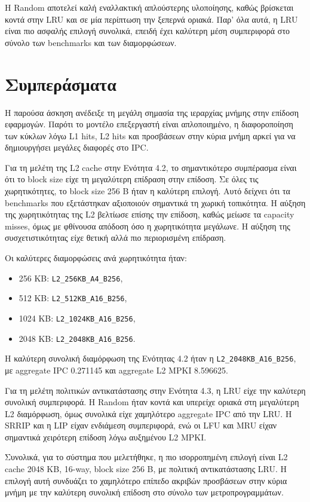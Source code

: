 \documentclass{article}
\begin{document}
Η Random αποτελεί καλή εναλλακτική απλούστερης υλοποίησης, καθώς βρίσκεται κοντά στην LRU και σε μία περίπτωση την ξεπερνά οριακά. Παρ' όλα αυτά, η LRU είναι πιο ασφαλής επιλογή συνολικά, επειδή έχει καλύτερη μέση συμπεριφορά στο σύνολο των benchmarks και των διαμορφώσεων.

\FloatBarrier

\section{Συμπεράσματα}

Η παρούσα άσκηση ανέδειξε τη μεγάλη σημασία της ιεραρχίας μνήμης στην επίδοση εφαρμογών. Παρότι το μοντέλο επεξεργαστή είναι απλοποιημένο, η διαφοροποίηση των κύκλων λόγω L1 hits, L2 hits και προσβάσεων στην κύρια μνήμη αρκεί για να δημιουργήσει μεγάλες διαφορές στο IPC.

Για τη μελέτη της L2 cache στην Ενότητα 4.2, το σημαντικότερο συμπέρασμα είναι ότι το block size είχε τη μεγαλύτερη επίδραση στην επίδοση. Σε όλες τις χωρητικότητες, το block size 256 B ήταν η καλύτερη επιλογή. Αυτό δείχνει ότι τα benchmarks που εξετάστηκαν αξιοποιούν σημαντικά τη χωρική τοπικότητα. Η αύξηση της χωρητικότητας της L2 βελτίωσε επίσης την επίδοση, καθώς μείωσε τα capacity misses, όμως με φθίνουσα απόδοση όσο η χωρητικότητα μεγάλωνε. Η αύξηση της συσχετιστικότητας είχε θετική αλλά πιο περιορισμένη επίδραση.

Οι καλύτερες διαμορφώσεις ανά χωρητικότητα ήταν:

\begin{itemize}
    \item 256 KB: \texttt{L2\_256KB\_A4\_B256},
    \item 512 KB: \texttt{L2\_512KB\_A16\_B256},
    \item 1024 KB: \texttt{L2\_1024KB\_A16\_B256},
    \item 2048 KB: \texttt{L2\_2048KB\_A16\_B256}.
\end{itemize}

Η καλύτερη συνολική διαμόρφωση της Ενότητας 4.2 ήταν η \texttt{L2\_2048KB\_A16\_B256}, με aggregate IPC 0.271145 και aggregate L2 MPKI 8.596625.

Για τη μελέτη πολιτικών αντικατάστασης στην Ενότητα 4.3, η LRU είχε την καλύτερη συνολική συμπεριφορά. Η Random ήταν κοντά και υπερείχε οριακά στη μεγαλύτερη L2 διαμόρφωση, όμως συνολικά είχε χαμηλότερο aggregate IPC από την LRU. Η SRRIP και η LIP είχαν ενδιάμεση συμπεριφορά, ενώ οι LFU και MRU είχαν σημαντικά χειρότερη επίδοση λόγω αυξημένου L2 MPKI.

Συνολικά, για το σύστημα που μελετήθηκε, η πιο ισορροπημένη επιλογή είναι L2 cache 2048 KB, 16-way, block size 256 B, με πολιτική αντικατάστασης LRU. Η επιλογή αυτή συνδυάζει το χαμηλότερο επίπεδο ακριβών προσβάσεων στην κύρια μνήμη με την καλύτερη συνολική επίδοση στο σύνολο των μετροπρογραμμάτων.
\end{document}
